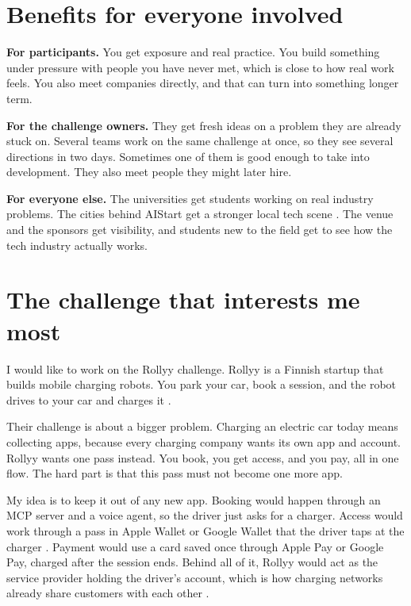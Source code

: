 \documentclass[11pt,a4paper]{article}
\begin{document}
\section*{Benefits for everyone involved}

\textbf{For participants.} You get exposure and real practice. You build
something under pressure with people you have never met, which is close to how
real work feels. You also meet companies directly, and that can turn into
something longer term.

\textbf{For the challenge owners.} They get fresh ideas on a problem they are
already stuck on. Several teams work on the same challenge at once, so they see
several directions in two days. Sometimes one of them is good enough to take into
development. They also meet people they might later hire.

\textbf{For everyone else.} The universities get students working on real
industry problems. The cities behind AIStart get a stronger local tech scene
\cite{aistart}. The venue and the sponsors get visibility, and students new
to the field get to see how the tech industry actually works.

\section*{The challenge that interests me most}

I would like to work on the Rollyy challenge. Rollyy is a Finnish startup that
builds mobile charging robots. You park your car, book a session, and the robot
drives to your car and charges it \cite{rollyy}.

Their challenge is about a bigger problem. Charging an electric car today means
collecting apps, because every charging company wants its own app and account.
Rollyy wants one pass instead. You book, you get access, and you pay, all in one
flow. The hard part is that this pass must not become one more app.

My idea is to keep it out of any new app. Booking would happen through an MCP
server and a voice agent, so the driver just asks for a charger. Access would
work through a pass in Apple Wallet or Google Wallet that the driver taps at the
charger \cite{applepasskit}. Payment would use a card saved once through
Apple Pay or Google Pay, charged after the session ends. Behind all of it, Rollyy
would act as the service provider holding the driver's account, which is how
charging networks already share customers with each other \cite{ocpi_guide}.
\end{document}
